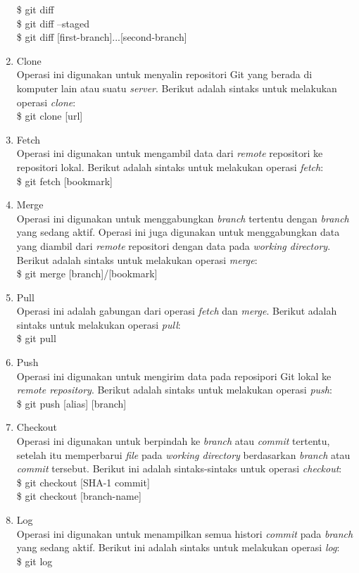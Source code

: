 \begin{enumerate}
\$ git diff \\
\$ git diff --staged\\
\$ git diff [first-branch]...[second-branch]
\item Clone\\
Operasi ini digunakan untuk menyalin repositori Git yang berada di komputer lain atau suatu \textit{server}. Berikut adalah sintaks untuk melakukan operasi \textit{clone}:\\
\$ git clone [url]
\item Fetch\\
Operasi ini digunakan untuk mengambil data dari \textit{remote} repositori ke repositori lokal. Berikut adalah sintaks untuk melakukan operasi \textit{fetch}:\\
\$ git fetch [bookmark]
\item Merge\\
Operasi ini digunakan untuk menggabungkan \textit{branch} tertentu dengan \textit{branch} yang sedang aktif. Operasi ini juga digunakan untuk menggabungkan data yang diambil dari \textit{remote} repositori dengan data pada \textit{working directory}. Berikut adalah sintaks untuk melakukan operasi \textit{merge}:\\
\$ git merge [branch]/[bookmark]
\item Pull\\
Operasi ini adalah gabungan dari operasi \textit{fetch} dan \textit{merge}. Berikut adalah sintaks untuk melakukan operasi \textit{pull}:\\
\$ git pull
\item Push\\
Operasi ini digunakan untuk mengirim data pada reposipori Git lokal ke \textit{remote repository}.
Berikut adalah sintaks untuk melakukan operasi \textit{push}:\\
\$ git push [alias] [branch]
\item Checkout\\
Operasi ini digunakan untuk berpindah ke \textit{branch} atau \textit{commit} tertentu, setelah itu memperbarui \textit{file} pada \textit{working directory} berdasarkan \textit{branch} atau \textit{commit} tersebut. Berikut ini adalah sintaks-sintaks untuk operasi \textit{checkout}:\\
\$ git checkout [SHA-1 commit]\\
\$ git checkout [branch-name]
\item Log\\
Operasi ini digunakan untuk menampilkan semua histori \textit{commit} pada \textit{branch} yang sedang aktif. Berikut ini adalah sintaks untuk melakukan operasi \textit{log}:\\
\$ git log
\end{enumerate}
